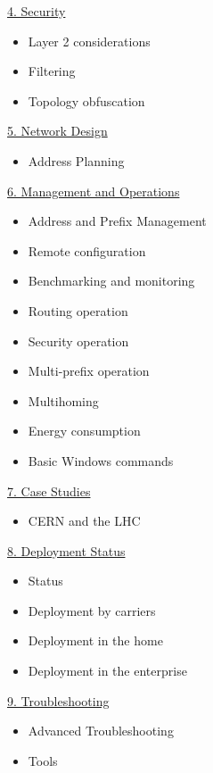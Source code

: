 \documentclass[
]{article}
\providecommand{\tightlist}{%
  \setlength{\itemsep}{0pt}\setlength{\parskip}{0pt}}
\begin{document}
\hyperref[security]{4. Security}

\begin{itemize}
\tightlist
\item
  Layer 2 considerations
\item
  Filtering
\item
  Topology obfuscation
\end{itemize}

\hyperref[network-design]{5. Network Design}

\begin{itemize}
\tightlist
\item
  Address Planning
\end{itemize}

\hyperref[management-and-operations]{6. Management and Operations}

\begin{itemize}
\tightlist
\item
  Address and Prefix Management
\item
  Remote configuration
\item
  Benchmarking and monitoring
\item
  Routing operation
\item
  Security operation
\item
  Multi-prefix operation
\item
  Multihoming
\item
  Energy consumption
\item
  Basic Windows commands
\end{itemize}

\hyperref[case-studies]{7. Case Studies}

\begin{itemize}
\tightlist
\item
  CERN and the LHC
\end{itemize}

\hyperref[deployment-status]{8. Deployment Status}

\begin{itemize}
\tightlist
\item
  Status
\item
  Deployment by carriers
\item
  Deployment in the home
\item
  Deployment in the enterprise
\end{itemize}

\hyperref[troubleshooting]{9. Troubleshooting}

\begin{itemize}
\tightlist
\item
  Advanced Troubleshooting
\item
  Tools
\end{itemize}
\end{document}
